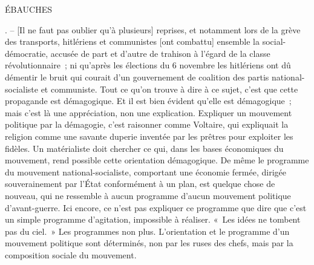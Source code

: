 \documentclass[french,twoside]{book} %
\begin{document}
\begin{center}
ÉBAUCHES\end{center}
. – [Il ne faut pas oublier qu'à plusieurs] reprises, et notamment lors de la grève des transports, hitlériens et communistes [ont combattu] ensemble la social-démocratie, accusée de part et d'autre de trahison à l'égard de la classe révolutionnaire ; ni qu'après les élections du 6 novembre les hitlériens ont dû démentir le bruit qui courait d'un gouvernement de coalition des partis national-socialiste et communiste. Tout ce qu'on trouve à dire à ce sujet, c'est que cette propagande est démagogique. Et il est bien évident qu'elle est démagogique ; mais c'est là une appréciation, non une explication. Expliquer un mouvement politique par la démagogie, c'est raisonner comme Voltaire, qui expliquait la religion comme une savante duperie inventée par les prêtres pour exploiter les fidèles. Un matérialiste doit chercher ce qui, dans les bases économiques du mouvement, rend possible cette orientation démagogique. De même le programme du mouvement national-socialiste, comportant une économie fermée, dirigée souverainement par l'État conformément à un plan, est quelque chose de nouveau, qui ne ressemble à aucun programme d'aucun mouvement politique d'avant-guerre. Ici encore, ce n'est pas expliquer ce programme que dire que c'est un simple programme d'agitation, impossible à réaliser. « Les idées ne tombent pas du ciel. » Les programmes non plus. L'orientation et le programme d'un mouvement politique sont déterminés, non par les ruses des chefs, mais par la composition sociale du mouvement.\par
\end{document}
